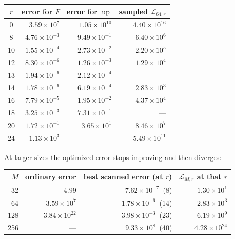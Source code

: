 \documentclass[11pt,oneside]{article}
\numberwithin{equation}{section}
\theoremstyle{definition}
\theoremstyle{remark}
\newcommand{\Up}{\operatorname{up}}
\newcommand{\Leb}{\mathscr L}
\begin{document}
\begin{center}
\small
\begin{tabular}{@{}crrr@{}}
\toprule
$r$ & error for $F$ & error for $\Up$ & sampled $\Leb_{64,r}$ \\
\midrule
0  & $3.59\times10^{7}$  & $1.05\times10^{10}$ & $4.40\times10^{16}$ \\
8  & $4.76\times10^{-3}$ & $9.49\times10^{-1}$ & $6.40\times10^{6}$ \\
10 & $1.55\times10^{-4}$ & $2.73\times10^{-2}$ & $2.20\times10^{5}$ \\
12 & $8.30\times10^{-6}$ & $1.26\times10^{-3}$ & $1.29\times10^{4}$ \\
13 & $1.94\times10^{-6}$ & $2.12\times10^{-4}$ & --- \\
14 & $1.78\times10^{-6}$ & $6.19\times10^{-4}$ & $2.83\times10^{3}$ \\
16 & $7.79\times10^{-5}$ & $1.95\times10^{-2}$ & $4.37\times10^{4}$ \\
18 & $3.25\times10^{-3}$ & $7.31\times10^{-1}$ & --- \\
20 & $1.72\times10^{-1}$ & $3.65\times10^{1}$  & $8.46\times10^{7}$ \\
24 & $1.13\times10^{3}$  & ---                 & $5.49\times10^{11}$ \\
\bottomrule
\end{tabular}
\label{tab:jet64}
\end{center}

At larger sizes the optimized error stops improving and then
diverges:
\begin{center}
\small
\begin{tabular}{rrrr}
\toprule
$M$ & ordinary error & best scanned error (at $r$) & $\Leb_{M,r}$ at that $r$ \\
\midrule
32  & $4.99$               & $7.62\times10^{-7}$\ (8)  & $1.30\times10^{1}$ \\
64  & $3.59\times10^{7}$   & $1.78\times10^{-6}$\ (14) & $2.83\times10^{3}$ \\
128 & $3.84\times10^{22}$  & $3.98\times10^{-3}$\ (23) & $6.19\times10^{9}$ \\
256 & ---                  & $9.33\times10^{8}$\ (40)  & $4.28\times10^{24}$ \\
\bottomrule
\end{tabular}
\label{tab:optimized}
\end{center}
\end{document}
